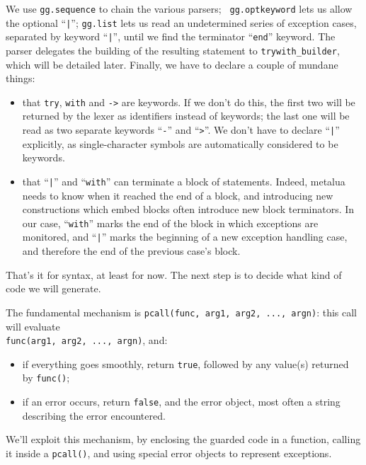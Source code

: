 We use {\tt gg.sequence} to chain the various parsers; {\tt
  gg.optkeyword} lets us allow the optional ``{\tt|}''; {\tt gg.list}
lets us read an undetermined series of exception cases, separated by
keyword ``{\tt|}'', until we find the terminator ``{\tt end}''
keyword. The parser delegates the building of the resulting statement
to {\tt trywith\_builder}, which will be detailed later. Finally, we
have to declare a couple of mundane things:
\begin{itemize}
\item that {\tt try}, {\tt with} and {\tt->} are keywords. If we don't
  do this, the first two will be returned by the lexer as identifiers
  instead of keywords; the last one will be read as two separate
  keywords ``{\tt-}'' and ``{\tt>}''. We don't have to declare
  ``{\tt|}'' explicitly, as single-character symbols are automatically
  considered to be keywords.
\item that ``{\tt|}'' and ``{\tt with}'' can terminate a block of
  statements. Indeed, metalua needs to know when it reached the end of
  a block, and introducing new constructions which embed blocks often
  introduce new block terminators. In our case, ``{\tt with}'' marks
  the end of the block in which exceptions are monitored, and ``{\tt|}''
  marks the beginning of a new exception handling case, and therefore
  the end of the previous case's block.
\end{itemize}

That's it for syntax, at least for now. The next step is to decide
what kind of code we will generate.

The fundamental mechanism is {\tt pcall(func, arg1, arg2, ...,
  argn)}: this call will evaluate\\
{\tt func(arg1, arg2, ..., argn)}, and:
\begin{itemize}
\item if everything goes smoothly, return {\tt true}, followed by any
  value(s) returned by {\tt func()};
\item if an error occurs, return {\tt false}, and the error object,
  most often a string describing the error encountered.
\end{itemize}

We'll exploit this mechanism, by enclosing the guarded code in a
function, calling it inside a {\tt pcall()}, and using special error
objects to represent exceptions.


